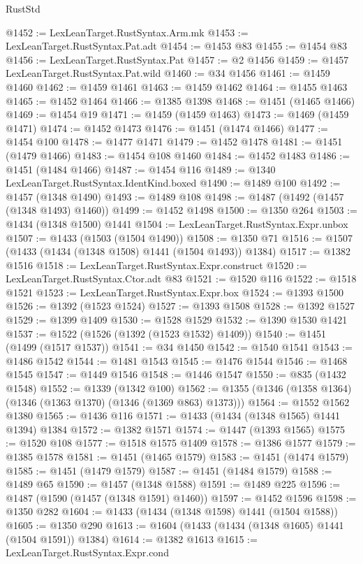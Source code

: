\begin{lexlean}{RustStd}
\begin{coremodule}
@1452 := LexLeanTarget.RustSyntax.Arm.mk
@1453 := LexLeanTarget.RustSyntax.Pat.adt
@1454 := @1453 @83
@1455 := @1454 @83
@1456 := LexLeanTarget.RustSyntax.Pat
@1457 := @2 @1456
@1459 := @1457 LexLeanTarget.RustSyntax.Pat.wild
@1460 := @34 @1456
@1461 := @1459 @1460
@1462 := @1459 @1461
@1463 := @1459 @1462
@1464 := @1455 @1463
@1465 := @1452 @1464
@1466 := @1385 @1398
@1468 := @1451 (@1465 @1466)
@1469 := @1454 @19
@1471 := @1459 (@1459 @1463)
@1473 := @1469 (@1459 @1471)
@1474 := @1452 @1473
@1476 := @1451 (@1474 @1466)
@1477 := @1454 @100
@1478 := @1477 @1471
@1479 := @1452 @1478
@1481 := @1451 (@1479 @1466)
@1483 := @1454 @108 @1460
@1484 := @1452 @1483
@1486 := @1451 (@1484 @1466)
@1487 := @1454 @116
@1489 := @1340 LexLeanTarget.RustSyntax.IdentKind.boxed
@1490 := @1489 @100
@1492 := @1457 (@1348 @1490)
@1493 := @1489 @108
@1498 := @1487 (@1492 (@1457 (@1348 @1493) @1460))
@1499 := @1452 @1498
@1500 := @1350 @264
@1503 := @1434 (@1348 @1500) @1441
@1504 := LexLeanTarget.RustSyntax.Expr.unbox
@1507 := @1433 (@1503 (@1504 @1490))
@1508 := @1350 @71
@1516 := @1507 (@1433 (@1434 (@1348 @1508) @1441 (@1504 @1493)) @1384)
@1517 := @1382 @1516
@1518 := LexLeanTarget.RustSyntax.Expr.construct
@1520 := LexLeanTarget.RustSyntax.Ctor.adt @83
@1521 := @1520 @116
@1522 := @1518 @1521
@1523 := LexLeanTarget.RustSyntax.Expr.box
@1524 := @1393 @1500
@1526 := @1392 (@1523 @1524)
@1527 := @1393 @1508
@1528 := @1392 @1527
@1529 := @1399 @1409
@1530 := @1528 @1529
@1532 := @1390 @1530 @1421
@1537 := @1522 (@1526 (@1392 (@1523 @1532) @1409))
@1540 := @1451 (@1499 (@1517 @1537))
@1541 := @34 @1450
@1542 := @1540 @1541
@1543 := @1486 @1542
@1544 := @1481 @1543
@1545 := @1476 @1544
@1546 := @1468 @1545
@1547 := @1449 @1546
@1548 := @1446 @1547
@1550 := @835 (@1432 @1548)
@1552 := @1339 (@1342 @100)
@1562 := @1355 (@1346 (@1358 @1364) (@1346 (@1363 @1370) (@1346 (@1369 @863) @1373)))
@1564 := @1552 @1562 @1380
@1565 := @1436 @116
@1571 := @1433 (@1434 (@1348 @1565) @1441 @1394) @1384
@1572 := @1382 @1571
@1574 := @1447 (@1393 @1565)
@1575 := @1520 @108
@1577 := @1518 @1575 @1409
@1578 := @1386 @1577
@1579 := @1385 @1578
@1581 := @1451 (@1465 @1579)
@1583 := @1451 (@1474 @1579)
@1585 := @1451 (@1479 @1579)
@1587 := @1451 (@1484 @1579)
@1588 := @1489 @65
@1590 := @1457 (@1348 @1588)
@1591 := @1489 @225
@1596 := @1487 (@1590 (@1457 (@1348 @1591) @1460))
@1597 := @1452 @1596
@1598 := @1350 @282
@1604 := @1433 (@1434 (@1348 @1598) @1441 (@1504 @1588))
@1605 := @1350 @290
@1613 := @1604 (@1433 (@1434 (@1348 @1605) @1441 (@1504 @1591)) @1384)
@1614 := @1382 @1613
@1615 := LexLeanTarget.RustSyntax.Expr.cond

\end{coremodule}
\end{lexlean}
